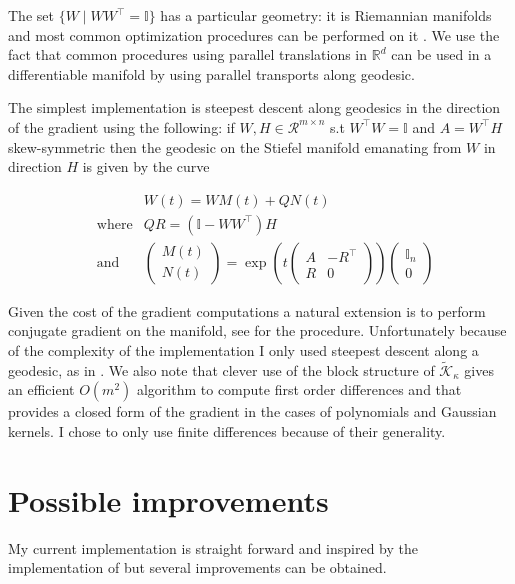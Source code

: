 \documentclass[a4paper,BCOR=5mm,oneside,openany]{scrreprt}
\begin{document}
The set $\{ W \mid W W^\intercal = \mathbb{I} \}$ has a particular geometry: it is Riemannian manifolds and most common optimization procedures can be performed on it \cite{Edelman1998}. We use the fact that common procedures using parallel translations in $\mathbb{R}^d$ can be used in a differentiable manifold by using parallel transports along geodesic.

The simplest implementation is steepest descent along geodesics in the direction of the gradient using the following: if $W, H \in \mathcal{R}^{m \times n}$ s.t $W^\intercal W = \mathbb{I}$ and $A = W^\intercal H$ skew-symmetric then the geodesic on the Stiefel manifold emanating from $W$ in direction $H$ is given by the curve

\begin{align*}
	& &W (t) = W M (t) + Q N (t) \\
	&\text{where} & QR = (\mathbb{I} - W W^\intercal) H \\
	&\text{and} &\begin{pmatrix}
		M(t) \\ N(t)
	\end{pmatrix} = \exp \left( t \begin{pmatrix}
		A & - R^\intercal \\
		R & 0
	\end{pmatrix} \right) \begin{pmatrix}
		\mathbb{I}_n \\ 0
	\end{pmatrix}
\end{align*}
						
Given the cost of the gradient computations a natural extension is to perform conjugate gradient on the manifold, see \cite{Edelman1998} for the procedure. Unfortunately because of the complexity of the implementation I only used steepest descent along a geodesic, as in \cite{Bach2002}. We also note that clever use of the block structure of $\tilde{\mathcal{K}}_\kappa$ gives an efficient $O(m^2)$ algorithm to compute first order differences and that \cite{Bach2002} provides a closed form of the gradient in the cases of polynomials and Gaussian kernels. I chose to only use finite differences because of their generality.

\section{Possible improvements}

My current implementation is straight forward and inspired by the implementation of \cite{Bach2002} but several improvements can be obtained.
\end{document}
